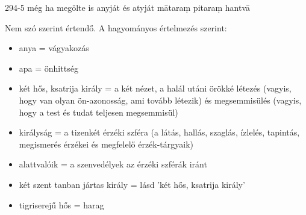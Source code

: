 
\begin{notesdescription}

\item[{294-5}
{még ha megölte is anyját és atyját}
{mātaraṃ pitaraṃ hantvā}] \hfill\par

Nem szó szerint értendő. A hagyományos értelmezés szerint:

\begin{itemize}
\item anya = vágyakozás
\item apa = önhittség
\item két hős, ksatrija király = a két nézet, a halál utáni örökké létezés (vagyis, hogy van olyan ön-azonosság, ami tovább létezik) és megsemmisülés (vagyis, hogy a test és tudat teljesen megsemmisül)
\item királyság = a tizenkét érzéki szféra (a látás, hallás, szaglás, ízlelés, tapintás, megismerés érzékei és megfelelő érzék-tárgyaik)
\item alattvalóik = a szenvedélyek az érzéki szférák iránt
\item két szent tanban jártas király = lásd 'két hős, ksatrija király'
\item tigriserejű hős = harag
\end{itemize}

\end{notesdescription}

